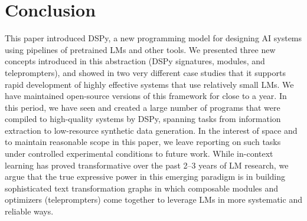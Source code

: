 \section{Conclusion}\label{sec:conclusion}

This paper introduced DSPy, a new programming model for designing AI systems using pipelines of pretrained LMs and other tools. We presented three new concepts introduced in this abstraction (DSPy signatures, modules, and teleprompters), and showed in two very different case studies that it supports rapid development of highly effective systems that use relatively small LMs. We have maintained open-source versions of this framework for close to a year. In this period, we have seen and created a large number of programs that were compiled to high-quality systems by DSPy, spanning tasks from information extraction to low-resource synthetic data generation. In the interest of space and to maintain reasonable scope in this paper, we leave reporting on such tasks under controlled experimental conditions to future work. While in-context learning has proved transformative over the past 2--3 years of LM research, we argue that the true expressive power in this emerging paradigm is in building sophisticated text transformation graphs in which composable modules and optimizers (teleprompters) come together to leverage LMs in more systematic and reliable ways.


